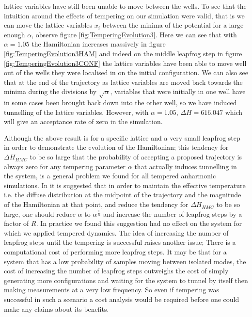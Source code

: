 \documentclass[12pt]{article}
\begin{document}
lattice variables have still been unable to move between the wells. To see that the intuition around the effects of tempering on our simulation were valid, that is we can move the lattice variables $x_i$ between the minima of the potential for a large enough $\alpha$, observe figure \ref{fig:TemperingEvolution3}. Here we can see that with $\alpha=1.05$ the Hamiltonian increases massively in figure \ref{fig:TemperingEvolution3HAM} and indeed on the middle leapfrog step in figure \ref{fig:TemperingEvolution3CONF} the lattice variables have been able to move well out of the wells they were localised in on the initial configuration. We can also see that at the end of the trajectory as lattice variables are moved back towards the minima during the divisions by $\sqrt{\alpha}$, variables that were initially in one well have in some cases been brought back down into the other well, so we have induced tunnelling of the lattice variables. However, with $\alpha=1.05$, $\Delta H = 616.047$ which will give an acceptance rate of zero in the simulation. 

Although the above result is for a specific lattice and a very small leapfrog step in order to demonstrate the evolution of the Hamiltonian; this tendency for $\Delta H_{HMC}$ to be so large that the probability of accepting a proposed trajectory is always zero for any tempering parameter $\alpha$ that actually induces tunnelling in the system, is a general problem we found for all tempered anharmonic simulations. In \cite{neal_2011} it is suggested that in order to maintain the effective temperature i.e. the diffuse distribution at the midpoint of the trajectory and the magnitude of the Hamiltonian at that point, and reduce the tendency for $\Delta H_{HMC}$ to be so large, one should reduce $\alpha$ to $\alpha^{\frac{1}{R}}$ and increase the number of leapfrog steps by a factor of $R$. In practice we found this suggestion had no effect on the system for which we applied tempered dynamics. The idea of increasing the number of leapfrog steps until the tempering is successful raises another issue; There is a computational cost of performing more leapfrog steps. It may be that for a system that has a low probability of samples moving between isolated modes, the cost of increasing the number of leapfrog steps outweighs the cost of simply generating more configurations and waiting for the system to tunnel by itself then making measurements at a very low frequency. So even if tempering was successful in such a scenario a cost analysis would be required before one could make any claims about its benefits. 
\end{document}
